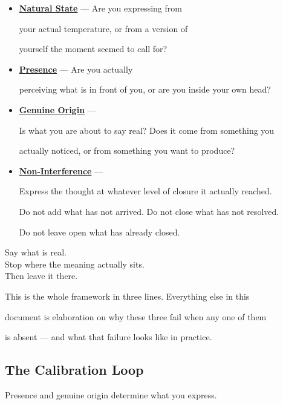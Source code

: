 \documentclass[12pt, a4paper]{article}
\begin{document}
\begin{itemize}

\item \textbf{\hyperref[sec:natural_state]{Natural State}} --- Are you expressing from

your actual temperature, or from a version of

yourself the moment seemed to call for?

\item \textbf{\hyperref[sec:presence]{Presence}} --- Are you actually

perceiving what is in front of you, or are you inside your own head?

\item \textbf{\hyperref[subsec:origin_and_closure]{Genuine Origin}} ---

Is what you are about to say real? Does it come from something you

actually noticed, or from something you want to produce?

\item \textbf{\hyperref[subsec:stopping_point]{Non-Interference}} ---

Express the thought at whatever level of closure it actually reached.

Do not add what has not arrived. Do not close what has not resolved.

Do not leave open what has already closed.

\end{itemize}

Say what is real.\\

Stop where the meaning actually sits.\\

Then leave it there.

This is the whole framework in three lines. Everything else in this

document is elaboration on why these three fail when any one of them

is absent --- and what that failure looks like in practice.


\subsection{The Calibration Loop}

Presence and genuine origin determine what you express.
\end{document}

